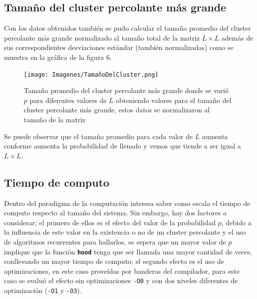 \documentclass[11pt,twocolumn]{article}
\begin{document}
\subsection{\textbf{Tamaño del cluster percolante más grande}}
Con los datos obtenidos también se pudo calcular el tamaño promedio del cluster percolante más grande normalizado al tamaño total de la matriz $L\times L$ además de sus correspondientes desviaciones estándar (también normalizadas) como se muestra en la gráfica de la figura 6.

\begin{figure}[H]
    \texttt{[image: Imagenes/TamañoDelCluster.png]}
    \caption{Tamaño promedio del cluster percolante más grande donde se varió $p$ para diferentes valores de $L$ obteniendo valores para el tamaño del cluster percolante más grande, estos datos se normalizaron al tamaño de la matriz}
    \label{Tamaño}
\end{figure}

Se puede observar que el tamaño promedio para cada valor de $L$ aumenta conforme aumenta la probabilidad de llenado y vemos que tiende a ser igual a $L\times L$.

\subsection{\textbf{Tiempo de computo}}

Dentro del paradigma de la computación interesa saber como escala el tiempo de computo respecto al tamaño del sistema. Sin embargo, hay dos factores a considerar; el primero de ellos es el efecto del valor de la probabilidad $p$, debido a la influencia de este valor en la existencia o no de un cluster percolante y el uso de algoritmos recurrentes para hallarlos, se espera que un mayor valor de $p$ implique que la función \textbf{\texttt{hood}} tenga que ser llamada una mayor cantidad de veces, conllevando un mayor tiempo de computo; el segundo efecto es el uso de optimizaciones, en este caso proveídas por banderas del compilador, para este caso se evaluó el efecto sin optimizaciones \texttt{-O0} y con dos niveles diferentes de optimización (\texttt{-O1} y \texttt{-O3}). \\
\vspace{0.2 cm}
\end{document}
